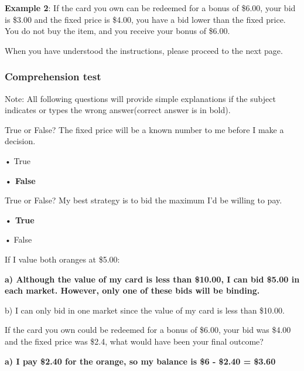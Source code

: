 \documentclass[12pt]{article}
\begin{document}
\textbf{Example 2}: If the card you own can be redeemed for a bonus of \$6.00, your bid is \$3.00 and the fixed price is \$4.00, you have a bid lower than the fixed price. You do not buy the item, and you receive your bonus of \$6.00.

\vspace{0.5cm}

When you have understood the instructions, please proceed to the next page.
\clearpage


\subsubsection*{Comprehension test}
Note: All following questions will provide simple explanations if the subject indicates or types the wrong answer(correct answer is in bold).

\vspace{0.5cm}

True or False? The fixed price will be a known number to me before I make a decision.  

• True  \par
\textbf{• False}\par  

\vspace{0.5cm}


\vspace{0.5cm}



True or False? My best strategy is to bid the maximum I'd be willing to pay.  

\textbf{• True}  \par
• False 

\vspace{0.5cm}

If I value both oranges at \$5.00:

\textbf{a) Although the value of my card is less than \$10.00, I can bid \$5.00 in each market. However, only one of these bids will be binding.}  

b) I can only bid in one market since the value of my card is less than \$10.00.  

\vspace{0.5cm}

If the card you own could be redeemed for a bonus of \$6.00, your bid was \$4.00 and the fixed price was \$2.4, what would have been your final outcome?  

\textbf{a) I pay \$2.40 for the orange, so my balance is \$6 - \$2.40 = \$3.60 } 
\end{document}

